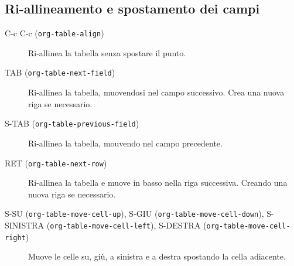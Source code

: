 \documentclass[11pt]{article}
\begin{document}
\subsection*{Ri-allineamento e spostamento dei campi}
\label{sec:orga223928}
\begin{description}
\item[{C-c C-c (\texttt{org-table-align})}] Ri-allinea la tabella senza spostare il punto.

\item[{TAB (\texttt{org-table-next-field})}] Ri-allinea la tabella, muovendosi nel campo successivo. Crea una
nuova riga se necessario.

\item[{S-TAB (\texttt{org-table-previous-field})}] Ri-allinea la tabella, mouvendo nel campo precedente.

\item[{RET (\texttt{org-table-next-row})}] Ri-allinea la tabella e muove in basso nella riga
successiva. Creando una nuova riga se necessario.

\item[{S-SU (\texttt{org-table-move-cell-up}), S-GIU (\texttt{org-table-move-cell-down}), S-SINISTRA (\texttt{org-table-move-cell-left}), S-DESTRA (\texttt{org-table-move-cell-right})}] Muove le celle su, giù, a sinistra e a destra spostando la cella adiacente.
\end{description}
\end{document}
